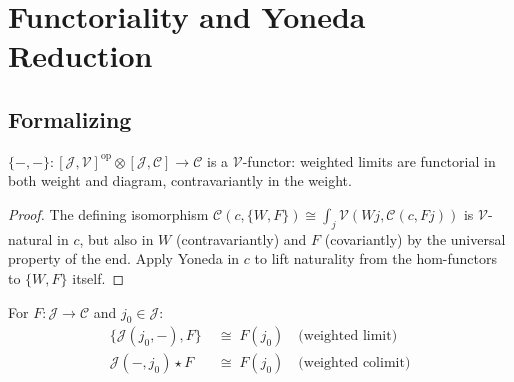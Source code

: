 \section{Functoriality and Yoneda Reduction}
\label{sec:wlim-functoriality}

\subsection{Formalizing}

\begin{proposition}
\label{prop:wlim-functorial}
$\{-, -\} : [\mathcal{J}, \mathcal{V}]^{\mathrm{op}} \otimes
[\mathcal{J}, \mathcal{C}] \to \mathcal{C}$ is a $\mathcal{V}$-functor:
weighted limits are functorial in both weight and diagram, contravariantly
in the weight.
\end{proposition}

\begin{proof}
The defining isomorphism $\mathcal{C}(c, \{W, F\}) \cong \int_j \mathcal{V}(Wj,
\mathcal{C}(c, Fj))$ is $\mathcal{V}$-natural in $c$, but also in $W$
(contravariantly) and $F$ (covariantly) by the universal property of the end.
Apply Yoneda in $c$ to lift naturality from the hom-functors to $\{W, F\}$
itself.
\end{proof}

\begin{theorem}
\label{thm:wlim-yoneda-reduction}
For $F : \mathcal{J} \to \mathcal{C}$ and $j_0 \in \mathcal{J}$:
\begin{align*}
  \{\mathcal{J}(j_0, -), F\} &\;\cong\; F(j_0) \quad\text{(weighted limit)} \\
  \mathcal{J}(-, j_0) \star F &\;\cong\; F(j_0) \quad\text{(weighted colimit)}
\end{align*}
\end{theorem}

